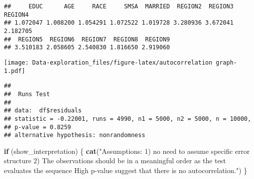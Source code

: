 \documentclass[
]{article}
\newenvironment{Shaded}{\begin{snugshade}}{\end{snugshade}}
\newcommand{\AttributeTok}[1]{\textcolor[rgb]{0.13,0.29,0.53}{#1}}
\newcommand{\ControlFlowTok}[1]{\textcolor[rgb]{0.13,0.29,0.53}{\textbf{#1}}}
\newcommand{\FunctionTok}[1]{\textcolor[rgb]{0.13,0.29,0.53}{\textbf{#1}}}
\newcommand{\NormalTok}[1]{#1}
\newcommand{\OtherTok}[1]{\textcolor[rgb]{0.56,0.35,0.01}{#1}}
\newcommand{\SpecialCharTok}[1]{\textcolor[rgb]{0.81,0.36,0.00}{\textbf{#1}}}
\newcommand{\StringTok}[1]{\textcolor[rgb]{0.31,0.60,0.02}{#1}}
\begin{document}
\begin{verbatim}
##     EDUC      AGE     RACE     SMSA  MARRIED  REGION2  REGION3  REGION4 
## 1.072047 1.008200 1.054291 1.072522 1.019728 3.280936 3.672041 2.182705 
##  REGION5  REGION6  REGION7  REGION8  REGION9 
## 3.510183 2.058605 2.540830 1.816650 2.919060
\end{verbatim}

\begin{Shaded}
\end{Shaded}

\texttt{[image: Data-exploration\_files/figure-latex/autocorrelation graph-1.pdf]}

\begin{Shaded}
\end{Shaded}

\begin{verbatim}
## 
##  Runs Test
## 
## data:  df$residuals
## statistic = -0.22001, runs = 4990, n1 = 5000, n2 = 5000, n = 10000,
## p-value = 0.8259
## alternative hypothesis: nonrandomness
\end{verbatim}

\begin{Shaded}
\begin{Highlighting}[]
\ControlFlowTok{if}\NormalTok{ (show\_interpretation) \{}
  \FunctionTok{cat}\NormalTok{(}\StringTok{"Assumptions:}
\StringTok{  1) no need to assume specific error structure}
\StringTok{  2) The observations should be in a meaningful order as the test evaluates the sequence}
\StringTok{  High p{-}value suggest that there is no autocorrelation."}\NormalTok{)}
\NormalTok{  \}}
\end{Highlighting}
\end{Shaded}
\end{document}

